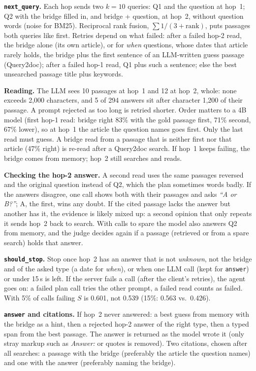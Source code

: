 \documentclass[10pt,a4paper]{article}
\begin{document}
\textbf{\texttt{next\_query}.} Each hop sends two $k{=}10$ queries: Q1 and the question at hop~1; Q2 with the
bridge filled in, and bridge + question, at hop~2, without question words (noise for BM25). Reciprocal rank
fusion, $\sum 1/(3+\mathrm{rank})$, puts passages both queries like first. Retries depend on what failed: after a
failed hop-2 read, the bridge alone (its own article), or for \emph{when} questions, whose dates that article
rarely holds, the bridge plus the first sentence of an LLM-written guess passage (Query2doc); after a failed hop-1
read, Q1 plus such a sentence; else the best unsearched passage title plus keywords.

\textbf{Reading.} The LLM sees 10 passages at hop~1 and 12 at hop~2, whole: none exceeds 2,000 characters,
and 5 of 294 answers sit after character 1,200 of their passage. A prompt rejected as too long is retried shorter. Order matters to a 4B model (first hop-1 read: bridge right 83\% with the gold passage first, 71\%
second, 67\% lower), so at hop~1 the article the question names goes first. Only the last read must guess. A bridge read from a passage that is neither first nor that article (47\% right) is re-read after a
Query2doc search. If hop~1 keeps failing, the bridge comes from memory; hop~2 still searches and reads.

\textbf{Checking the hop-2 answer.} A second read uses the same passages reversed and the original question
instead of Q2, which the plan sometimes words badly. If the answers disagree, one call shows both with their passages and asks \emph{``A or B?''}; A, the first, wins any doubt. If the cited
passage lacks the answer but another has it, the evidence is likely mixed up: a second opinion that only repeats
it sends hop~2 back to search. With calls to spare the model also answers Q2 from memory, and the judge decides
again if a passage (retrieved or from a spare search) holds that answer.

\textbf{\texttt{should\_stop}.} Stop once hop~2 has an answer that is not \emph{unknown}, not the bridge and of
the asked type (a date for \emph{when}), or when one LLM call (kept for \texttt{answer}) or under 15\,s is left.
If the server fails a call (after the client's retries), the agent goes on: a failed plan call tries the other
prompt, a failed read counts as failed. With 5\% of calls failing $S$ is 0.601, not 0.539 (15\%: 0.563 vs.\ 0.426).

\textbf{\texttt{answer} and citations.} If hop~2 never answered: a best guess from memory with the bridge as a
hint, then a rejected hop-2 answer of the right type, then a typed span from the best passage. The answer is returned as the model wrote it (only stray markup such as
\emph{Answer:} or quotes is removed). Two citations, chosen after all searches: a passage with the
bridge (preferably the article the question names) and one with the answer (preferably naming the bridge).
\end{document}
